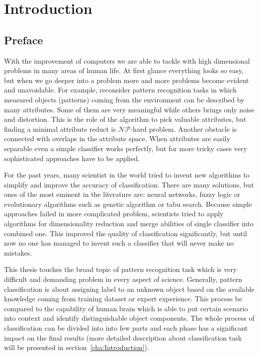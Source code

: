 \section{Introduction}
\subsection{Preface}
\label{cha:Goals}
With the improvement of computers we are able to tackle with high dimensional 
problems in many areas of human life. At first glance everything
looks so easy, but when we go deeper into a problem more and more problems 
become evident and unavoidable. For example, reconsider pattern recognition
tasks in which measured objects (patterns) coming from the environment can be 
described by many attributes. Some of them are very meaningful while others brings only noise 
and distortion. This is the role of the algorithm to pick valuable attributes,
but finding a minimal attribute reduct is $\mathcal{NP}$-hard problem. Another
obstacle is connected with overlaps in the attribute space. When attributes 
are easily separable even a simple classifier works perfectly, but for more 
tricky cases very sophisticated approaches have to be applied.

For the past years, many scientist in the world tried to invent new algorithms
to simplify and improve the accuracy of classification. There are many solutions, 
but ones of the most eminent in the literature are: neural networks, fuzzy logic or 
evolutionary algorithms such as genetic algorithm or tabu search. 
Because simple approaches failed in more complicated problem, scientists tried
to apply algorithms for dimensionality reduction and merge abilities of single
classifier into combined one. This improved the quality of classification 
significantly, but until now no one has managed to invent such a classifier 
that will never make no mistakes.

This thesis touches the broad topic of pattern recognition task which is 
very difficult and demanding problem in every aspect of science. Generally, 
pattern classification is about assigning label to an unknown object based 
on the available knowledge coming from training dataset or expert experience.
This process be compared to the capability of human brain which is able to put 
certain scenario into context and identify distinguishable object components. 
The whole process of classification can be divided into into few parts and each 
phase has a significant impact on the final results (more detailed description
about classification task will be presented in section~\ref{cha:Introduction}).


